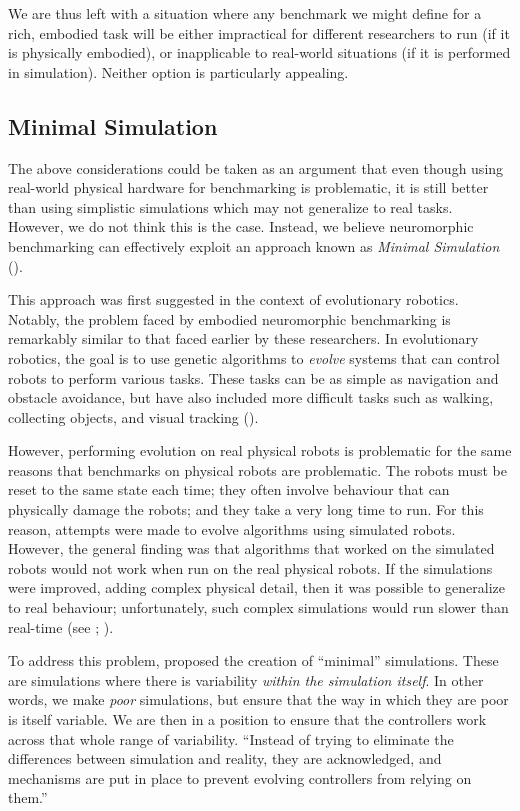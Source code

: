 \documentclass{frontiersSCNS} %
\begin{document}
We are thus left with a situation where any benchmark we might define for
a rich, embodied task will be either impractical for different researchers to
run (if it is physically embodied), or inapplicable to real-world situations
(if it is performed in simulation).  Neither option is particularly appealing.

\subsection{Minimal Simulation}

The above considerations could be taken as an argument that even though using real-world
physical hardware for benchmarking is problematic, it is still better than
using simplistic simulations which may not generalize to real tasks.  However,
we do not think this is the case.  Instead, we believe neuromorphic benchmarking can effectively exploit an approach 
known as \emph{Minimal Simulation}
(\citealt{Jakobi97evolutionaryrobotics}).

This approach was first suggested in the context of evolutionary robotics.  
Notably, the problem faced by embodied neuromorphic benchmarking is remarkably 
similar to that faced earlier by these researchers. 
In evolutionary robotics, the
goal is to use genetic algorithms to \emph{evolve} systems that can control
robots to perform various tasks.  These tasks can be as simple as navigation
and obstacle avoidance, but have also included more difficult tasks such as walking,
collecting objects, and visual tracking (\citealt{Nolfi2000}).

However, performing evolution on real physical robots is problematic
for the same reasons that benchmarks on physical robots are problematic.  The
robots must be reset to the same state each time; they often involve
behaviour that can physically damage the robots; and they take a very long
time to run.  For this reason, attempts were made to evolve algorithms using simulated
robots.  However, the general finding was that algorithms that worked on the
simulated robots would not work when run on the real physical robots.  If
the simulations were improved, adding complex physical detail, then it was
possible to generalize to real behaviour; unfortunately, such complex
simulations would run slower than real-time (see \citealt{Husbands1992}; 
\citealt{Husbands1993}).

To address this problem, \cite{Jakobi97evolutionaryrobotics} proposed the creation of
``minimal'' simulations.  These are simulations where there is variability
\emph{within the simulation itself}.  In other words, we make \emph{poor}
simulations, but ensure that the way in which they are poor is itself
variable.  We are then in a position to ensure that the controllers work across that whole
range of variability.  ``Instead of trying to eliminate the differences between
simulation and reality, they are acknowledged, and mechanisms are put in place
to prevent evolving controllers from relying on them.'' \citep[p.~48]{jakobiThesis}
\end{document}
